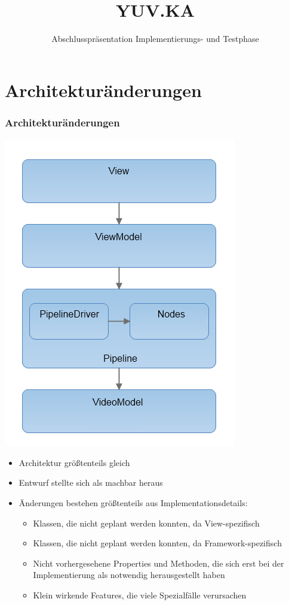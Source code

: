 \documentclass[t]{beamer}
\title{YUV.KA}
\subtitle{Abschlusspräsentation Implementierungs- und Testphase}
\institute[ITEC]{Institut für Technische Informatik}
\begin{document}
\begin{frame}
\maketitle
\end{frame}
 
\section{Architekturänderungen}
\begin{frame}
    \frametitle{Architekturänderungen}
    \noindent
    \begin{minipage}{3.5cm}
        \includegraphics[scale=0.37]{images/Layers.png}
    \end{minipage}
    \hfill
    \begin{minipage}{8cm}
    \begin{itemize}
        \item Architektur größtenteils gleich
        \item Entwurf stellte sich als machbar heraus
        \item Änderungen bestehen größtenteils aus Implementationsdetails:
        \begin{itemize}
            \item Klassen, die nicht geplant werden konnten, da View-spezifisch
            \item Klassen, die nicht geplant werden konnten, da Framework-spezifisch
            \item Nicht vorhergesehene Properties und Methoden, die sich erst bei der Implementierung als notwendig herausgestellt haben
            \item Klein wirkende Features, die viele Spezialfälle verursachen
        \end{itemize}
    \end{itemize}
    \end{minipage}
\end{frame}
\end{document}
